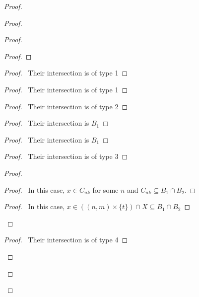 \documentclass{report}
\theoremstyle{definition}
\begin{document}
\begin{proof}
\begin{proof}
\begin{proof}
\begin{proof}
       \end{proof}
       \begin{proof}
         \pf\ Their intersection is of type 1
       \end{proof}
       \begin{proof}
         \pf\ Their intersection is of type 1
       \end{proof}
       \begin{proof}
         \pf\ Their intersection is of type 2
       \end{proof}
       \begin{proof}
         \pf\ Their intersection is $B_1$
       \end{proof}
       \begin{proof}
         \pf\ Their intersection is $B_1$
       \end{proof}
       \begin{proof}
         \pf\ Their intersection is of type 3
       \end{proof}
       \begin{proof}
\begin{proof}
  \pf\ In this case, $x \in C_{nk}$ for some $n$ and $C_{nk} \subseteq B_1 \cap
B_2$.
\end{proof}
         \begin{proof}
           \pf\ In this case, $x \in ((n, m) \times \{ t \}) \cap X \subseteq
B_1 \cap B_2$
         \end{proof}
       \end{proof}
       \begin{proof}
         \pf\ Their intersection is of type 4
       \end{proof}

\end{proof}
\end{proof}
\end{proof}
\end{document}
